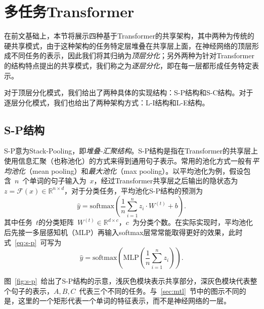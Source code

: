 \section{多任务Transformer}
\label{sec:mtl_tf}
在前文基础上，本节将展示四种基于Transformer的共享架构，其中两种为传统的硬共享模式，由于这种架构的任务特定层堆叠在共享层上面，在神经网络的顶层形成不同任务的表示，因此我们将其归纳为\emph{顶层分化}；另外两种为针对Transformer的结构特点提出的共享模式，我们称之为\emph{逐层分化}，即在每一层都形成任务特定表示。

对于顶层分化模式，我们给出了两种具体的实现结构：S-P结构和S-C结构。对于逐层分化模式，我们也给出了两种架构方式：L-I结构和L-E结构。

\subsection{S-P结构}
S-P意为Stack-Pooling，即\emph{堆叠-汇聚结构}。S-P结构是指在Transformer的共享层上使用信息汇聚（也称池化）的方式来得到通用句子表示。常用的池化方式一般有\emph{平均池化}（mean pooling）和\emph{最大池化}（max pooling）。以平均池化为例，假设包含~$n$~个单词的句子输入为~$x$，经过Transformer共享层之后输出的隐状态为~$z = \mathcal{F}(x) \in \mathbb{R}^{n \times d}$，对于分类任务，平均池化S-P结构的预测为
\begin{equation}
	\hat{y} = \mathrm{softmax}(\frac{1}{n}\sum_{i=1}^{n}z_i\cdot W^{(t)} + b).
	\label{eq:s-p}
\end{equation}
其中任务~$t$的分类矩阵~$W^{(t)}\in \mathbb{R}^{d\times c}$，$c$~为分类个数。在实际实现时，平均池化后先接一多层感知机（MLP）再输入softmax层常常能取得更好的效果，此时式~\ref{eq:s-p}~可写为
\begin{equation}
	\hat{y} = \mathrm{softmax}(\mathrm{MLP}(\frac{1}{n}\sum_{i=1}^{n}z_i)).
\end{equation}

图~\ref{fig:s-p}~给出了S-P结构的示意，浅灰色模块表示共享部分，深灰色模块代表整个句子的表示，$A,B,C$~代表三个不同的任务。与~\ref{sec:mtl}~节中的图示不同的是，这里的一个矩形代表一个单词的特征表示，而不是神经网络的一层。

